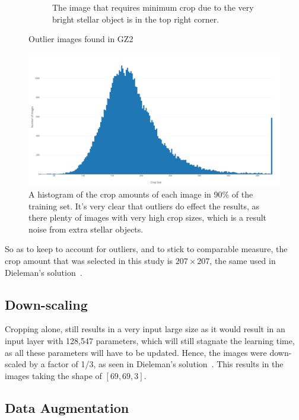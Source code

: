 \documentclass[12pt,a4paper,oneside,oldfontcommands]{memoir}
\begin{document}
\begin{Declaration Of OriginalityOrginality}
\begin{figure}[H]
\begin{subfigure}[b]{0.4\linewidth}
    \caption{The image that requires minimum crop due to the very bright stellar object is in the top right corner.}
  \end{subfigure}
  \caption{Outlier images found in GZ2}
  \label{fig:GZ2-2}
\end{figure}

\begin{figure}[ht]
    \center
      \includegraphics[width=\linewidth]{images/crop_analysis.png}
      \caption{A histogram of the crop amounts of each image in 90\% of the training set. It's very clear that outliers do effect the results, as there plenty of images with very high crop sizes, which is a result noise from extra stellar objects.}
      \label{fig:crop_histogram}
\end{figure}

So as to keep to account for outliers, and to stick to comparable measure, the crop amount that was selected in this study is \(207\times207\), the same used in Dieleman's solution~\cite{Sanders-GZ}.

\subsection{Down-scaling}

Cropping alone, still results in a very input large size as it would result in an input layer with 128,547 parameters, which will still stagnate the learning time, as all these parameters will have to be updated. Hence, the images were down-scaled by a factor of 1/3, as seen in Dieleman's solution~\cite{Sanders-GZ}. This results in the images taking the shape of \([69, 69, 3]\).

\subsection{Data Augmentation} \label{aug-section}


\end{Declaration Of OriginalityOrginality}
\end{document}

